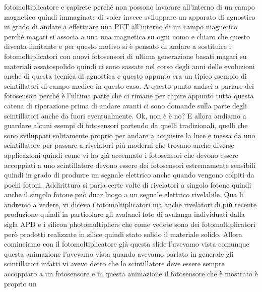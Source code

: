 fotomoltiplicatore e capirete perché non possono lavorare all'interno di un campo magnetico quindi immaginate di voler invece sviluppare un apparato di agnostico in grado di andare a effettuare una PET all'interno di un campo magnetico perché magari si associa a una una magnetica su ogni uomo e chiaro che questo diventa limitante e per questo motivo si è pensato di andare a sostituire i fotomoltiplicatori con nuovi fotosensori di ultima generazione basati magari su materiali assatospolido quindi ci sono sassate nel corso degli anni delle evoluzioni anche di questa tecnica di agnostica e questo appunto era un tipico esempio di scintillatori di campo medico in questo caso. A questo punto andrei a parlare dei fotosensori perché è l'ultima parte che ci rimane per capire appunto tutta questa catena di riperazione prima di andare avanti ci sono domande sulla parte degli scintillatori anche da fuori eventualmente. Ok, non è è no? E allora andiamo a guardare alcuni esempi di fotosensori partendo da quelli tradizionali, quelli che sono sviluppati solitamente proprio per andare a acquisire la luce e messa da uno scintillatore per passare a rivelatori più moderni che trovano anche diverse applicazioni quindi come vi ho già accennato i fotosensori che devono essere accoppiati a uno scintillatore devono essere dei fotosensori estremamente sensibili quindi in grado di produrre un segnale elettrico anche quando vengono colpiti da pochi fotoni. Addirittura si parla certe volte di rivelatori a singolo fotone quindi anche il singolo fotone può duar luogo a un segnale elettrico rivelabile. Qua li andremo a vedere, vi dicevo i fotomoltiplicatori ma anche rivelatori di più recente produzione quindi in particolare gli avalanci foto di avalanga individuati dalla sigla APD e i silicon photomultipliers che come vedete sono dei fotomoltiplicatori però prodotti realizzate in silice quindi stato solido il materiale solido. Allora cominciamo con il fotomoltiplicatore già questa slide l'avevamo vista comunque questa animazione l'avevamo vista quando avevamo parlato in generale gli scintillatori infatti vi avevo detto che lo scintillatore deve essere sempre accoppiato a un fotosensore e in questa animazione il fotosensore che è mostrato è proprio un 

